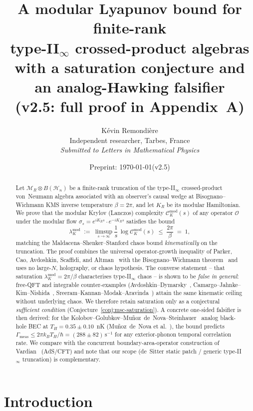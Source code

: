 \documentclass[12pt,a4paper]{article}
\title{\textbf{A modular Lyapunov bound for finite-rank\\
       type-II$_\infty$ crossed-product algebras}\\[6pt]
       \large with a saturation conjecture and an analog-Hawking falsifier\\[4pt]
       \normalsize (v2.5: full proof in Appendix~A)}
\author{%
  K\'evin Remondi\`ere\\[2pt]
  \small Independent researcher, Tarbes, France\\[2pt]
  \small \textit{Submitted to Letters in Mathematical Physics}
}
\date{Preprint: \today\quad(v2.5)}
\begin{document}
\maketitle

\begin{abstract}
Let $\mathcal{M}_R \otimes B(\mathcal{H}_n)$ be a finite-rank truncation of
the type-II$_\infty$ crossed-product von~Neumann algebra associated with an
observer's causal wedge at Bisognano--Wichmann KMS inverse temperature
$\beta = 2\pi$, and let $K_R$ be its modular Hamiltonian.
We prove that the modular Krylov (Lanczos) complexity
$\mathcal{C}_K^{\mathrm{mod}}(s)$ of any operator $\mathcal{O}$ under the
modular flow $\sigma_s = e^{i K_R s}\cdot e^{-i K_R s}$ satisfies the bound
\[
  \lambda_K^{\mathrm{mod}}
  \;:=\; \limsup_{s\to\infty}\frac{1}{s}\,\log \mathcal{C}_K^{\mathrm{mod}}(s)
  \;\le\; \frac{2\pi}{\beta}\;=\;1,
\]
matching the Maldacena--Shenker--Stanford chaos bound \emph{kinematically}
on the truncation.
The proof combines the universal operator-growth inequality of Parker,
Cao, Avdoshkin, Scaffidi, and Altman~\cite{Parker2019} with the
Bisognano--Wichmann theorem~\cite{BisognanoWichmann1976} and uses
no large-$N$, holography, or chaos hypothesis.
The converse statement -- that saturation $\lambda_K^{\mathrm{mod}} =
2\pi/\beta$ characterises type-II$_\infty$ chaos -- is shown to be
\emph{false in general}: free-QFT and integrable counter-examples
(Avdoshkin--Dymarsky~\cite{AvdoshkinDymarsky2019},
Camargo--Jahnke--Kim--Nishida~\cite{Camargo2023},
Sreeram--Kannan--Modak--Aravinda~\cite{Sreeram2025})
attain the same kinematic ceiling without underlying chaos.
We therefore retain saturation only as a conjectural \emph{sufficient
condition} (Conjecture~\ref{conj:msc-saturation}).
A concrete one-sided falsifier is then derived: for the
Kolobov--Golubkov--Mu\~{n}oz~de~Nova--Steinhauer~\cite{Kolobov2021}
analog black-hole BEC at $T_H = 0.35 \pm 0.10$~nK
(Mu\~{n}oz~de~Nova et al.~\cite{Steinhauer2019}), the bound predicts
$\Gamma_{\mathrm{meas}} \le 2\pi k_B T_H/\hbar = (288 \pm 82)\,\mathrm{s}^{-1}$
for any exterior-phonon temporal correlation rate.
We compare with the concurrent boundary-area-operator construction of
Vardian~\cite{Vardian2026} (AdS/CFT) and note that our scope (de~Sitter
static patch / generic type-II$_\infty$ truncation) is complementary.
\end{abstract}

\section{Introduction}
\label{sec:intro}
\end{document}

